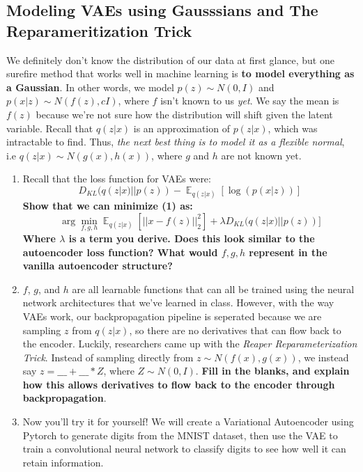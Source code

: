 \documentclass{article}
\DeclareMathOperator{\EX}{\mathbb{E}}%
\begin{document}
\subsection{Modeling VAEs using Gausssians and The Reparameritization Trick}
We definitely don't know the distribution of our data at first glance, but one surefire method that works well in machine learning is \textbf{to model everything as a Gaussian}. In other words, we model $p(z) \sim N(0, I)$ and $p(x|z) \sim N(f(z), cI)$, where $f$ isn't known to us \textit{yet}. We say the mean is $f(z)$ because we're not sure how the distribution will shift given the latent variable. Recall that $q(z|x)$ is an approximation of $p(z|x)$, which was intractable to find. Thus, \textit{the next best thing is to model it as a flexible normal}, i.e $q(z|x) \sim N(g(x), h(x))$, where $g$ and $h$ are not known yet.
\begin{enumerate}
    \item Recall that the loss function for VAEs were:
    \begin{equation}
        D_{KL}(q(z|x) || p(z)) - \EX_{q(z|x)}[\log(p(x|z))]
    \end{equation}
    \textbf{Show that we can minimize (1) as:}
    \begin{equation}
        \arg\min_{f, g, h} \EX_{q(z|x)}[||x - f(z)||_2^2] + \lambda D_{KL}(q(z|x) || p(z))]
    \end{equation}
    \textbf{Where $\lambda$ is a term you derive. Does this look similar to the autoencoder loss function? What would $f, g, h$ represent in the vanilla autoencoder structure?}

    \item $f$, $g$, and $h$ are all learnable functions that can all be trained using the neural network architectures that we've learned in class. However, with the way VAEs work, our backpropagation pipeline is seperated because we are sampling $z$ from $q(z|x)$, so there are no derivatives that can flow back to the encoder. Luckily, researchers came up with the \textit{Reaper Reparameterization Trick}. Instead of sampling directly from $z \sim N(f(x), g(x))$, we instead say $z = \_\_\_ + \_\_\_ * Z$, where $Z \sim N(0, I)$. \textbf{Fill in the blanks, and explain how this allows derivatives to flow back to the encoder through backpropagation}.

    \item Now you'll try it for yourself! We will create a Variational Autoencoder using Pytorch to generate digits from the MNIST dataset, then use the VAE to train a convolutional neural network to classify digits to see how well it can retain information.
\end{enumerate}
\end{document}
